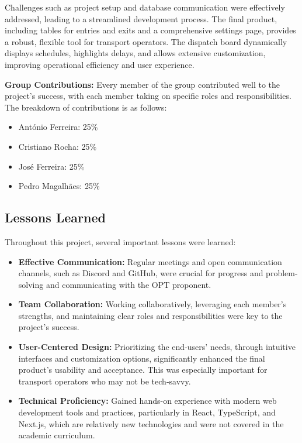 \documentclass[10pt]{article}
\begin{document}
        Challenges such as project setup and database communication were effectively addressed, leading to a streamlined development process. The final product, including tables for entries and exits and a comprehensive settings page, provides a robust, flexible tool for transport operators. The dispatch board dynamically displays schedules, highlights delays, and allows extensive customization, improving operational efficiency and user experience.


        \textbf{Group Contributions:}
        Every member of the group contributed well to the project's success, with each member taking on specific roles and responsibilities. The breakdown of contributions is as follows:
        \begin{itemize}
            \item António Ferreira: 25\%
            \item Cristiano Rocha: 25\%
            \item José Ferreira: 25\%
            \item Pedro Magalhães: 25\%
        \end{itemize}
         \subsection{Lessons Learned}

         Throughout this project, several important lessons were learned:

         \begin{itemize}
             \item \textbf{Effective Communication:} Regular meetings and open communication channels, such as Discord and GitHub, were crucial for progress and problem-solving and communicating with the OPT proponent.
             \item \textbf{Team Collaboration:} Working collaboratively, leveraging each member's strengths, and maintaining clear roles and responsibilities were key to the project's success.
             \item \textbf{User-Centered Design:} Prioritizing the end-users' needs, through intuitive interfaces and customization options, significantly enhanced the final product's usability and acceptance. This was especially important for transport operators who may not be tech-savvy.
             \item \textbf{Technical Proficiency:} Gained hands-on experience with modern web development tools and practices, particularly in React, TypeScript, and Next.js, which are relatively new technologies and were not covered in the academic curriculum.
         \end{itemize}
\end{document}
